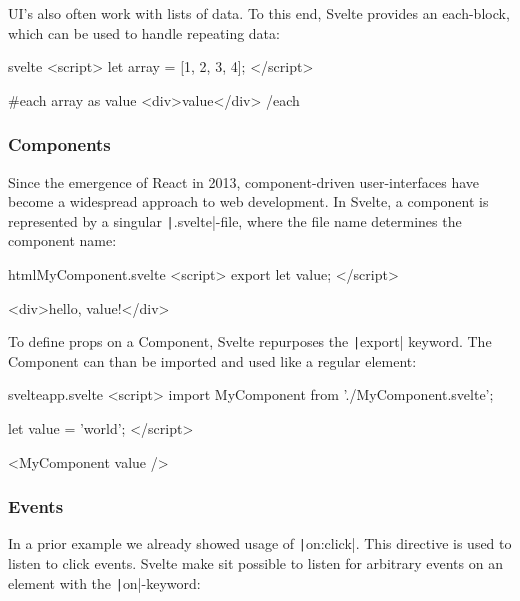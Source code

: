 UI's also often work with lists of data. To this end, Svelte provides an each-block, which can be used to handle repeating data:

\begin{myminted}[highlightlines={5-7}]{svelte}{}
<script>
  let array = [1, 2, 3, 4];
</script>

{#each array as value}
  <div>{value}</div>
{/each}
\end{myminted}

\subsubsection{Components}


Since the emergence of React in 2013, component-driven user-interfaces have become a widespread approach to web development. In Svelte, a component is represented by a singular \texttt|.svelte|-file, where the file name determines the component name:

\begin{myminted}{html}{MyComponent.svelte}
<script>
  export let value;
</script>

<div>hello, {value}!</div>
\end{myminted}

To define props on a Component, Svelte repurposes the \texttt|export| keyword. The Component can than be imported and used like a regular element:

\begin{myminted}{svelte}{app.svelte}
<script>
  import MyComponent from './MyComponent.svelte';

  let value = 'world';
</script>

<MyComponent {value} />
\end{myminted}

\subsubsection{Events}


In a prior example we already showed usage of \texttt|on:click|. This directive is used to listen to click events. Svelte make sit possible to listen for arbitrary events on an element with the \texttt|on|-keyword:

